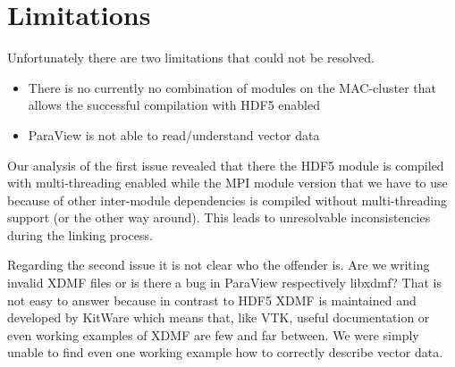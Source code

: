 \section{Limitations}

Unfortunately there are two limitations that could not be resolved.

\begin{itemize}
\item There is no currently no combination of modules on the MAC-cluster that
  allows the successful compilation with HDF5 enabled
\item ParaView is not able to read/understand vector data
\end{itemize}

Our analysis of the first issue revealed that there the HDF5 module is compiled
with multi-threading enabled while the MPI module version that we have to use
because of other inter-module dependencies is compiled without multi-threading
support (or the other way around). This leads to unresolvable inconsistencies
during the linking process.

Regarding the second issue it is not clear who the offender is. Are we writing
invalid XDMF files or is there a bug in ParaView respectively libxdmf? That is
not easy to answer because in contrast to HDF5 XDMF is maintained and developed
by KitWare which means that, like VTK, useful documentation or even working
examples of XDMF are few and far between. We were simply unable to find even one
working example how to correctly describe vector data.

